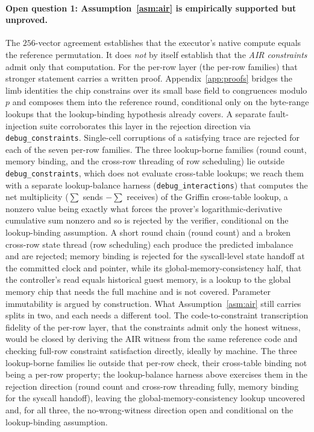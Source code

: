 \paragraph{Open question 1: Assumption~\ref{asm:air} is empirically supported but unproved.}
The $256$-vector agreement establishes that the executor's native compute equals the reference permutation. It does \emph{not} by itself establish that the \emph{AIR constraints} admit only that computation. For the per-row layer (the per-row families) that stronger statement carries a written proof. Appendix~\ref{app:proofs} bridges the limb identities the chip constrains over its small base field to congruences modulo $p$ and composes them into the reference round, conditional only on the byte-range lookups that the lookup-binding hypothesis already covers. A separate fault-injection suite corroborates this layer in the rejection direction via \texttt{debug\_constraints}. Single-cell corruptions of a satisfying trace are rejected for each of the seven per-row families. The three lookup-borne families (round count, memory binding, and the cross-row threading of row scheduling) lie outside \texttt{debug\_constraints}, which does not evaluate cross-table lookups; we reach them with a separate lookup-balance harness (\texttt{debug\_interactions}) that computes the net multiplicity ($\sum$ sends $-\sum$ receives) of the Griffin cross-table lookup, a nonzero value being exactly what forces the prover's logarithmic-derivative cumulative sum nonzero and so is rejected by the verifier, conditional on the lookup-binding assumption. A short round chain (round count) and a broken cross-row state thread (row scheduling) each produce the predicted imbalance and are rejected; memory binding is rejected for the syscall-level state handoff at the committed clock and pointer, while its global-memory-consistency half, that the controller's read equals historical guest memory, is a lookup to the global memory chip that needs the full machine and is not covered. Parameter immutability is argued by construction. What Assumption~\ref{asm:air} still carries splits in two, and each needs a different tool. The code-to-constraint transcription fidelity of the per-row layer, that the constraints admit only the honest witness, would be closed by deriving the AIR witness from the same reference code and checking full-row constraint satisfaction directly, ideally by machine. The three lookup-borne families lie outside that per-row check, their cross-table binding not being a per-row property; the lookup-balance harness above exercises them in the rejection direction (round count and cross-row threading fully, memory binding for the syscall handoff), leaving the global-memory-consistency lookup uncovered and, for all three, the no-wrong-witness direction open and conditional on the lookup-binding assumption.

